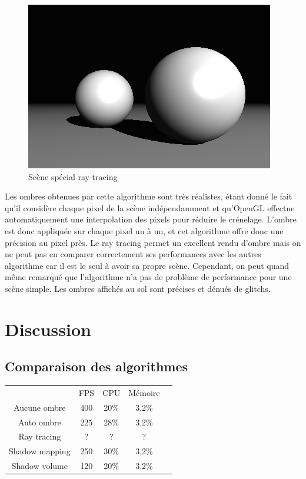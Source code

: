\documentclass[a4paper,10pt]{report}
\begin{document}
\begin{figure}[H]
\includegraphics[scale=0.4]{images/raytracing.png}
\centering
\caption{Scène spécial ray-tracing}
\end{figure}

Les ombres obtenues par cette algorithme sont très réalistes, étant donné le fait qu'il considère chaque pixel de la scène indépendamment et qu'OpenGL effectue automatiquement une interpolation des pixels pour réduire le crénelage. L'ombre est donc appliquée sur chaque pixel un à un, et cet algorithme offre donc une précision au pixel près. Le ray tracing permet un excellent rendu d'ombre mais on ne peut pas en comparer correctement ses performances avec les autres algorithme car il est le seul à avoir sa propre scène. Cependant, on peut quand m\^eme remarqué que l'algorithme n'a pas de problème de performance pour une scène simple. Les ombres affichés au sol sont précises et dénués de glitchs.


\chapter{Discussion}

\section{Comparaison des algorithmes}
\begin{table}[h]
\centering
\begin{tabular}{|c|c|c|c|l}
\cline{1-4}
 & FPS  & CPU & Mémoire  &  \\ \cline{1-4}
 Aucune ombre& 400 & 20\%  & 3,2\%  &  \\ \cline{1-4}
 Auto ombre& 225 & 28\%  & 3,2\%  &  \\ \cline{1-4}
 Ray tracing& ? & ?  & ?  &  \\ \cline{1-4}
 Shadow mapping& 250  & 30\%  & 3,2\%  &  \\ \cline{1-4}
 Shadow volume& 120  & 20\%  & 3,2\%  &  \\ \cline{1-4}
\end{tabular}
\end{table}
\end{document}
